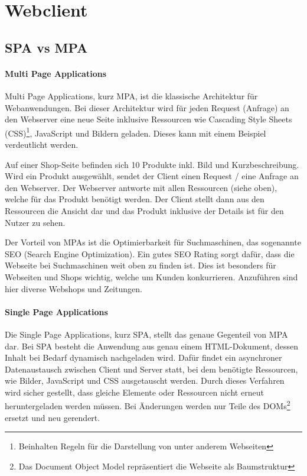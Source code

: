 \section{Webclient} \label{sec:Webclient}
\subsection{SPA vs MPA} \label{subsec:SPA_vs_MPA}

\paragraph{Multi  Page Applications} \label{para:Multi_Page_Applications}
Multi Page Applications, kurz MPA, ist die klassische Architektur für Webanwendungen. Bei dieser Architektur wird für jeden Request (Anfrage) an den Webserver eine neue Seite inklusive Ressourcen wie Cascading Style Sheets (CSS)\footnote{Beinhalten Regeln für die Darstellung von unter anderem Webseiten}, JavaScript und Bildern geladen. Dieses kann mit einem Beispiel verdeutlicht werden.

Auf einer Shop-Seite befinden sich 10 Produkte inkl. Bild und Kurzbeschreibung. Wird ein Produkt ausgewählt, sendet der Client einen Request / eine Anfrage an den Webserver. Der Webserver antworte mit allen Ressourcen (siehe oben), welche für das Produkt benötigt werden. Der Client stellt dann aus den Ressourcen die Ansicht dar und das Produkt inklusive der Details ist für den Nutzer zu sehen.

Der Vorteil von MPAs ist die Optimierbarkeit für Suchmaschinen, das sogenannte SEO (Search Engine Optimization). Ein gutes SEO Rating sorgt dafür, dass die Webseite bei Suchmaschinen weit oben zu finden ist. Dies ist besonders für Webseiten und Shops wichtig, welche um Kunden konkurrieren. Anzuführen sind hier diverse Webshops und Zeitungen.

\paragraph{Single Page Applications} \label{para:Single_Page_Applications}
Die Single Page Applications, kurz SPA, stellt das genaue Gegenteil von MPA dar. Bei SPA besteht die Anwendung aus genau einem HTML-Dokument, dessen Inhalt bei Bedarf dynamisch nachgeladen wird. Dafür findet ein asynchroner Datenaustausch zwischen Client und Server statt, bei dem benötigte Ressourcen, wie Bilder, JavaScript und CSS ausgetauscht werden. Durch dieses Verfahren wird sicher gestellt, dass gleiche Elemente oder Ressourcen nicht erneut heruntergeladen werden müssen. Bei Änderungen werden nur Teile des DOMs\footnote{Das Document Object Model repräsentiert die Webseite als Baumstruktur} ersetzt und neu gerendert.

